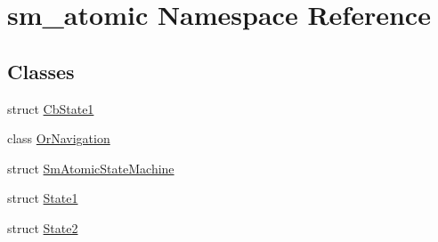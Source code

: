 \hypertarget{namespacesm__atomic}{}\section{sm\+\_\+atomic Namespace Reference}
\label{namespacesm__atomic}
\subsection*{Classes}
\begin{DoxyCompactItemize}
\item 
struct \hyperlink{structsm__atomic_1_1CbState1}{Cb\+State1}
\item 
class \hyperlink{classsm__atomic_1_1OrNavigation}{Or\+Navigation}
\item 
struct \hyperlink{structsm__atomic_1_1SmAtomicStateMachine}{Sm\+Atomic\+State\+Machine}
\item 
struct \hyperlink{structsm__atomic_1_1State1}{State1}
\item 
struct \hyperlink{structsm__atomic_1_1State2}{State2}
\end{DoxyCompactItemize}
